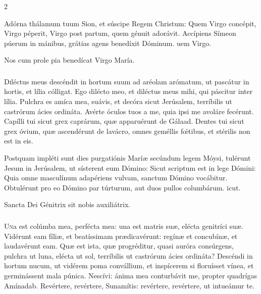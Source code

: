 \documentclass[9pt,twoside]{extarticle}
\begin{document}
\begin{multicols}{2}
\begin{tightlist}{}
\item {} Adórna thálamum tuum Sion, et súscipe Regem Christum: \textred{*} Quem Virgo concépit, Virgo péperit, Virgo post partum, quem génuit adorávit.  Accípiens Símeon púerum in mánibus, grátias agens benedíxit Dóminum. uem Virgo.
\item {\small {} Nos cum prole pia benedícat Virgo María.}
\end{tightlist}

\subsubsection*{\center{}}
\lettrine{D}iléctus meus descéndit in hortum suum ad aréolam arómatum, ut pascátur in hortis, et lília cólligat. Ego dilécto meo, et diléctus meus mihi, qui páscitur inter lília. Pulchra es amíca mea, suávis, et decóra sicut Jerúsalem, terríbilis ut castrórum ácies ordináta. Avérte óculos tuos a me, quia ipsi me avoláre fecérunt. Capílli tui sicut grex caprárum, quæ apparuérunt de Gálaad. Dentes tui sicut grex óvium, quæ ascendérunt de lavácro, omnes geméllis fœ́tibus, et stérilis non est in eis.

\begin{tightlist}{}
\item {} Postquam impléti sunt dies purgatiónis Maríæ secúndum legem Móysi, tulérunt Jesum in Jerúsalem, ut sísterent eum Dómino: \textred{*} Sicut scriptum est in lege Dómini: Quia omne masculínum adapériens vulvam, sanctum Dómino vocábitur.  Obtulérunt pro eo Dómino par túrturum, aut duos pullos columbárum. icut.
\item {\small {} Sancta Dei Génitrix sit nobis auxiliátrix.}
\end{tightlist}

\subsubsection*{\center{}}
\lettrine{U}na est colúmba mea, perfécta mea: una est matris suæ, elécta genitríci suæ. Vidérunt eam fíliæ, et beatíssimam prædicavérunt: regínæ et concubínæ, et laudavérunt eam. Quæ est ista, quæ progréditur, quasi auróra consúrgens, pulchra ut luna, elécta ut sol, terríbilis ut castrórum ácies ordináta? Descéndi in hortum nucum, ut vidérem poma convállium, et inspícerem si floruísset vínea, et germinássent mala púnica. Nescívi: ánima mea conturbávit me, propter quadrígas Amínadab. Revértere, revértere, Sunamítis: revértere, revértere, ut intueámur te.


\end{multicols}
\end{document}
